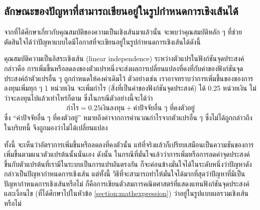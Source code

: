 \subsection{ลักษณะของปัญหาที่สามารถเขียนอยู่ในรูปกำหนดการเชิงเส้นได้}
จากที่ได้ศึกษาเกี่ยวกับคุณสมบัติของความเป็นเชิงเส้นมาแล้วนั้น จะพบว่าคุณสมบัติหลัก ๆ ที่ช่วยตัดสินใจได้ว่าปัญหาแบบใดมีโอกาสที่จะเขียนอยู่ในรูปกำหนดการเชิงเส้นได้ดังนี้
\begin{property}{คุณสมบัติความเป็นอิสระเชิงเส้น (linear independence) ระหว่างตัวแปรในฟังก์ชันจุดประสงค์}{}
    กล่าวคือ การเพิ่มขึ้นหรือลดลงของตัวแปรหนึ่งจะส่งผลการเปลี่ยนแปลงที่คงที่กับค่าของฟังก์ชันจุดประสงค์ถ้าตัวแปรอื่น ๆ ถูกกำหนดให้คงค่าเดิมไว้ ตัวอย่างเช่น เราอาจทราบว่าการเพิ่มขึ้นของของการลงทุนเพิ่มทุก ๆ 1 หน่วยเงิน จะเพิ่มกำไร (สิ่งที่เป็นค่าของฟังก์ชันจุดประสงค์) ได้ 0.25 หน่วยเงิน ไม่ว่าจะลงทุนไปแล้วเท่าไหร่ก็ตาม ซึ่งในกรณีตัวอย่างนี้จะได้ว่า $$\text{กำไร} = 0.25\text{เงินลงทุน} + \text{ค่าปัจจัยอื่น ๆ ที่คงตัวอยู่}$$
    ซึ่ง ``ค่าปัจจัยอื่น ๆ ที่คงตัวอยู่'' หมายถึงค่าจากการคำนวณกำไรจากตัวแปรอื่น ๆ ซึ่งไม่ได้ถูกกล่าวถึงในบริบทนี้ จึงถูกมองว่าไม่ได้เปลี่ยนแปลง
\end{property}
ทั้งนี้ จะเห็นว่าอัตราการเพิ่มขึ้นหรือลดลงที่คงตัวนั้น แท้ที่จริงแล้วก็เปรียบเสมือนเป็นความชันของการเพิ่มขึ้นตามแนวตัวแปรต้นนั้นนั่นเอง
ดังนั้น ในกรณีที่มั่นใจแล้วว่าการเพิ่มหรือการลดค่าจุดประสงค์ขึ้นกับตัวแปรต้นที่เรามีในระบบเป็นการแปรผันตรงกัน ก็จะค่อนข้างมั่นใจได้ในระดับหนึ่งว่าปัญหาดังกล่าวเป็นปัญหากำหนดการเชิงเส้น
แต่ทั้งนี้ วิธีที่จะสามารถทำให้มั่นใจได้มากที่สุดว่าปัญหาที่มีเป็นปัญหากำหนดการเชิงเส้นหรือไม่ ก็คือการเขียนตัวสมการคณิตศาสตร์ที่แสดงแทนฟังก์ชันจุดประสงค์และเงื่อนไข (ที่ได้ศึกษาไปในหัวข้อ \ref{section:mathexpression}) ว่าอยู่ในรูปแบบผลรวมเชิงเส้นหรือไม่

